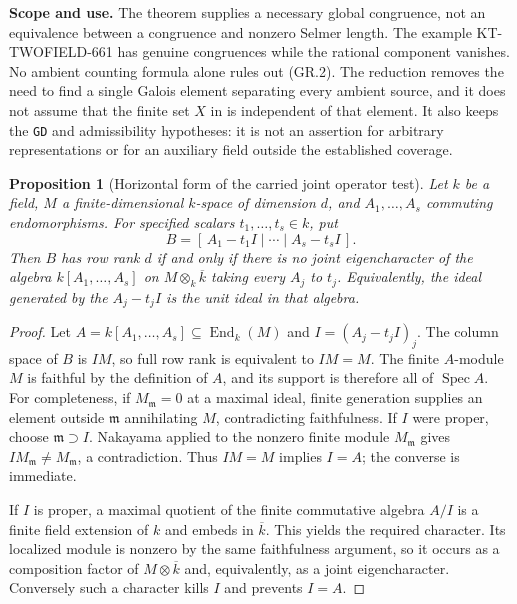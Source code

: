 \documentclass[11pt,a4paper]{article}
\newtheorem{proposition}[theorem]{Proposition}
\theoremstyle{definition}
\renewcommand{\paragraph}[1]{\par\smallskip\noindent\textbf{#1}\quad\ignorespaces}
\begin{document}
\paragraph{Scope and use.}
The theorem supplies a necessary global congruence, not an
equivalence between a congruence and nonzero Selmer length.
The example KT-TWOFIELD-661 has genuine congruences while
the rational component vanishes. No ambient counting
formula alone rules out (GR.2). The reduction removes the
need to find a single Galois element separating every
ambient source, and it does not assume that the finite set
$X$ in  is independent of that element.
It also keeps the \texttt{GD} and admissibility hypotheses:
it is not an assertion for arbitrary representations or
for an auxiliary field outside the established coverage.

\begin{proposition}[Horizontal form of the carried joint operator test]
Let $k$ be a field, $M$ a finite-dimensional $k$-space of
dimension $d$, and $A_1,\ldots,A_s$ commuting endomorphisms.
For specified scalars $t_1,\ldots,t_s\in k$, put
\[
 B=[\,A_1-t_1I\mid\cdots\mid A_s-t_sI\,].
                                                               \tag{GR.6}
\]
Then $B$ has row rank $d$ if and only if there is no
joint eigencharacter of the algebra $k[A_1,\ldots,A_s]$
on $M\otimes_k\overline k$ taking every $A_j$ to $t_j$.
Equivalently, the ideal generated by the $A_j-t_jI$ is
the unit ideal in that algebra.
\end{proposition}

\begin{proof}
Let $A=k[A_1,\ldots,A_s]\subseteq\operatorname{End}_k(M)$
and $I=(A_j-t_jI)_j$. The column space of $B$ is $IM$,
so full row rank is equivalent to $IM=M$.
The finite $A$-module $M$ is faithful by the definition of
$A$, and its support is therefore all of $\operatorname{Spec}A$.
For completeness, if $M_{\mathfrak m}=0$ at a maximal ideal,
finite generation supplies an element outside $\mathfrak m$
annihilating $M$, contradicting faithfulness. If $I$ were
proper, choose $\mathfrak m\supset I$. Nakayama applied to
the nonzero finite module $M_{\mathfrak m}$ gives
$IM_{\mathfrak m}\ne M_{\mathfrak m}$, a contradiction.
Thus $IM=M$ implies $I=A$; the converse is immediate.

If $I$ is proper, a maximal quotient of the finite
commutative algebra $A/I$ is a finite field extension of
$k$ and embeds in $\overline k$. This yields the required
character. Its localized module is nonzero by the same
faithfulness argument, so it occurs as a composition
factor of $M\otimes\overline k$ and, equivalently, as a
joint eigencharacter. Conversely such a character kills
$I$ and prevents $I=A$.
\end{proof}
\end{document}
